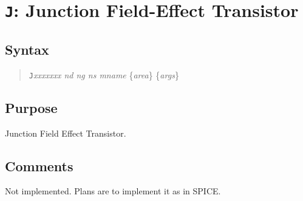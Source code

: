 \section{{\tt J}: Junction Field-Effect Transistor}
\subsection{Syntax}
\begin{verse}
{\tt J}{\it xxxxxxx nd ng ns mname} \{{\it area}\} \{{\it args}\}
\end{verse}
\subsection{Purpose}

Junction Field Effect Transistor.
\subsection{Comments}

Not implemented.
Plans are to implement it as in SPICE.
